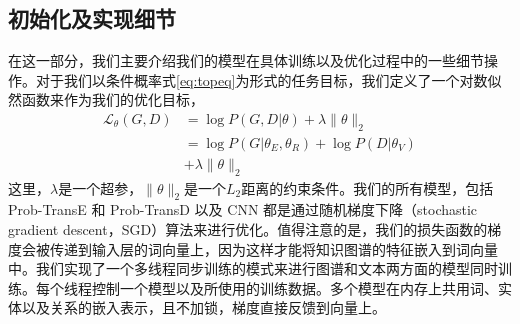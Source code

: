 \subsection{初始化及实现细节}
\label{sec:detail}
在这一部分，我们主要介绍我们的模型在具体训练以及优化过程中的一些细节操作。对于我们以条件概率式\ref{eq:topeq}为形式的任务目标，我们定义了一个对数似然函数来作为我们的优化目标，
\begin{align}
\mathcal{L}_{\theta}(G, D) & = \log P(G,D|{\theta}) + \lambda \lVert \theta \rVert_2 \\\nonumber
 & = \log P(G|{\theta_E, \theta_R}) + \log P(D|{\theta_V}) \\\nonumber
 & + \lambda \lVert \theta \rVert_2
\end{align}
这里，$\lambda$是一个超参，$\lVert \theta \rVert_2$是一个$L_2$距离的约束条件。我们的所有模型，包括 Prob-TransE 和 Prob-TransD 以及 CNN 都是通过随机梯度下降（stochastic gradient descent，SGD）算法来进行优化。值得注意的是，我们的损失函数的梯度会被传递到输入层的词向量上，因为这样才能将知识图谱的特征嵌入到词向量中。我们实现了一个多线程同步训练的模式来进行图谱和文本两方面的模型同时训练。每个线程控制一个模型以及所使用的训练数据。多个模型在内存上共用词、实体以及关系的嵌入表示，且不加锁，梯度直接反馈到向量上。







